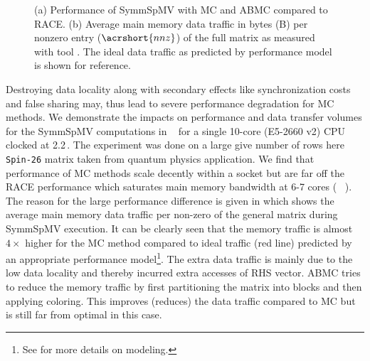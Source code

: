\begin{figure}[b]
	\hspace{0.5em}
	\caption{\label{fig:motivation}(a) Performance of \acrshort{SymmSpMV} with 
		\acrshort{MC} and \acrshort{ABMC} compared to \acrshort{RACE}. 
		(b) Average main memory data traffic in bytes (B) per nonzero entry ($\acrshort{nnz}$) 
		of the full matrix as measured with \LIKWID tool \cite{LIKWID}. The ideal data traffic
		as predicted by performance model is shown for reference.}
\end{figure}

Destroying data locality along with secondary effects like 
synchronization costs and false sharing may, thus lead to severe performance degradation for MC methods.
We demonstrate the impacts on performance and 
data transfer volumes for the \acrshort{SymmSpMV} computations in ~ for a single 10-core  \Intel \IVB (E5-2660 v2) CPU clocked at 2.2\,\GHZ.
The experiment was done on a large {\GW give number of rows here} \texttt{Spin-26} \cite{Spin} matrix taken from quantum physics application. 
We find that performance of MC methods scale decently within a socket but are far off the RACE performance which saturates main memory bandwidth at 6-7 cores (~ ).
The reason for the large performance difference is given in  which shows the average main memory data traffic per non-zero  of the 
general matrix during \acrshort{SymmSpMV} execution. It can be clearly seen that 
the memory traffic is almost  $4 \times$ higher 
for the \acrshort{MC} method compared to ideal traffic (red line) predicted
by an appropriate performance model\footnote{See  for more details on modeling.}.
The extra data traffic is mainly due to the low data locality and thereby incurred 
extra accesses of RHS vector. 
\Acrfull{ABMC} tries to reduce the memory traffic by first partitioning the matrix
into blocks and then applying coloring. This improves (reduces) the data traffic compared 
to \acrshort{MC} but is still far from optimal in this case. 

